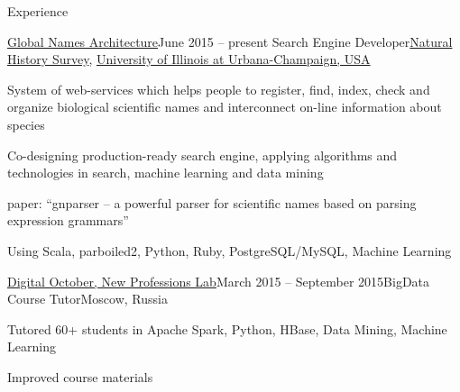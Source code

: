 \documentclass{resume} %
\begin{document}

\begin{rSection}{Experience}

\begin{samepage}
\begin{rSubsection}{\href{http://globalnames.org/}{Global Names Architecture}}{June 2015 -- present}
{Search Engine Developer}{\href{http://www.inhs.illinois.edu/}{Natural History Survey},
\href{http://illinois.edu/}{University of Illinois at Urbana-Champaign, USA}}
\item System of web-services which helps people to register, find, index, check and organize
biological scientific names and interconnect on-line information about species
\item Co-designing production-ready search engine, applying algorithms and technologies in search,
machine learning and data mining
\item paper: ``gnparser -- a powerful parser for scientific names based on parsing expression
grammars''
\item Using Scala, parboiled2, Python, Ruby, PostgreSQL/MySQL, Machine Learning
\end{rSubsection}
\end{samepage}

\pagebreak

\begin{samepage}
\begin{rSubsection}{\href{http://newprolab.com/bigdata/eng/}{Digital October, New Professions Lab}}{March 2015 -- September 2015}{BigData Course Tutor}{Moscow, Russia}
\item Tutored 60+ students in Apache Spark, Python, HBase, Data Mining, Machine Learning
\item Improved course materials
\end{rSubsection}
\end{samepage}



\end{rSection}
\end{document}
